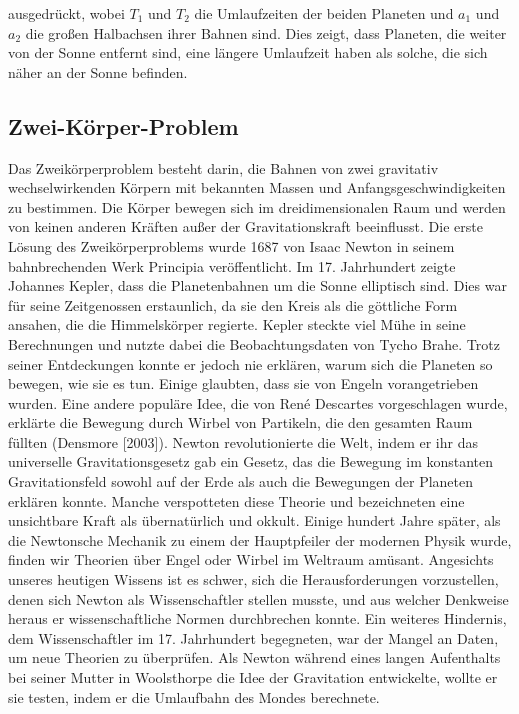 \documentclass[a4paper,12pt,twoside]{article}
\begin{document}
ausgedrückt, wobei \(T_1\) und \(T_2\) die Umlaufzeiten der beiden Planeten und \(a_1\) und \(a_2\) die großen Halbachsen ihrer Bahnen sind. Dies zeigt, dass Planeten, die weiter von der Sonne entfernt sind, eine längere Umlaufzeit haben als solche, die sich näher an der Sonne befinden.

\subsection{Zwei-Körper-Problem}
Das Zweikörperproblem besteht darin, die Bahnen von zwei gravitativ wechselwirkenden Körpern mit bekannten Massen und Anfangsgeschwindigkeiten zu bestimmen. 
Die Körper bewegen sich im dreidimensionalen Raum und werden von keinen anderen Kräften außer der Gravitationskraft beeinflusst. Die erste Lösung des Zweikörperproblems wurde 1687 von Isaac Newton in seinem bahnbrechenden Werk Principia veröffentlicht. 
Im 17. Jahrhundert zeigte Johannes Kepler, dass die Planetenbahnen um die Sonne elliptisch sind. Dies war für seine Zeitgenossen erstaunlich, da sie den Kreis als die göttliche Form ansahen, die die Himmelskörper regierte. 
Kepler steckte viel Mühe in seine Berechnungen und nutzte dabei die Beobachtungsdaten von Tycho Brahe. Trotz seiner Entdeckungen konnte er jedoch nie erklären, warum sich die Planeten so bewegen, wie sie es tun. Einige glaubten, dass sie von Engeln vorangetrieben wurden. 
Eine andere populäre Idee, die von René Descartes vorgeschlagen wurde, erklärte die Bewegung durch Wirbel von Partikeln, die den gesamten Raum füllten (Densmore [2003]). 
Newton revolutionierte die Welt, indem er ihr das universelle Gravitationsgesetz gab ein Gesetz, das die Bewegung im konstanten Gravitationsfeld sowohl auf der Erde als auch die Bewegungen der Planeten erklären konnte. 
Manche verspotteten diese Theorie und bezeichneten eine unsichtbare Kraft als übernatürlich und okkult. Einige hundert Jahre später, als die Newtonsche Mechanik zu einem der Hauptpfeiler der modernen Physik wurde, finden wir Theorien über Engel oder Wirbel im Weltraum amüsant. Angesichts unseres heutigen Wissens ist es schwer, sich die Herausforderungen vorzustellen, denen sich Newton als Wissenschaftler stellen musste, und aus welcher Denkweise heraus er wissenschaftliche 
Normen durchbrechen konnte. Ein weiteres Hindernis, dem Wissenschaftler im 17. Jahrhundert begegneten, war der Mangel an Daten, um neue Theorien zu überprüfen. Als Newton während eines langen Aufenthalts bei seiner Mutter in Woolsthorpe die Idee der Gravitation entwickelte, wollte er sie testen, indem er die Umlaufbahn des Mondes berechnete.
\end{document}
